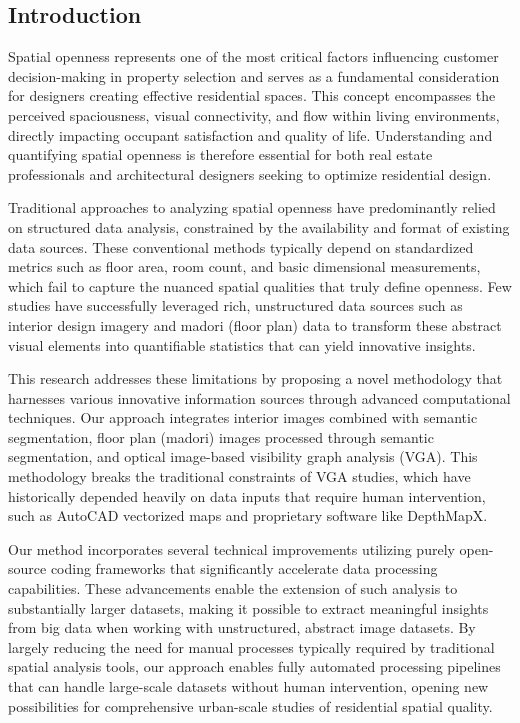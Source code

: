 \documentclass[11pt,a4paper]{article}
\begin{document}
\begin{multicols}{2}
\fontsize{11}{13}\selectfont

\section{Introduction}

Spatial openness represents one of the most critical factors influencing customer decision-making in
property selection and serves as a fundamental consideration for designers creating effective
residential spaces. This concept encompasses the perceived spaciousness, visual connectivity, and
flow within living environments, directly impacting occupant satisfaction and quality of life.
Understanding and quantifying spatial openness is therefore essential for both real estate
professionals and architectural designers seeking to optimize residential design.

Traditional approaches to analyzing spatial openness have predominantly relied on structured data
analysis, constrained by the availability and format of existing data sources. These conventional
methods typically depend on standardized metrics such as floor area, room count, and basic
dimensional measurements, which fail to capture the nuanced spatial qualities that truly define
openness. Few studies have successfully leveraged rich, unstructured data sources such as interior
design imagery and madori (floor plan) data to transform these abstract visual elements into
quantifiable statistics that can yield innovative insights.

This research addresses these limitations by proposing a novel methodology that harnesses various
innovative information sources through advanced computational techniques. Our approach integrates
interior images combined with semantic segmentation, floor plan (madori) images processed through
semantic segmentation, and optical image-based visibility graph analysis (VGA). This methodology
breaks the traditional constraints of VGA studies, which have historically depended heavily on data
inputs that require human intervention, such as AutoCAD vectorized maps and proprietary software
like DepthMapX.

Our method incorporates several technical improvements utilizing purely open-source coding
frameworks that significantly accelerate data processing capabilities. These advancements enable
the extension of such analysis to substantially larger datasets, making it possible to extract
meaningful insights from big data when working with unstructured, abstract image datasets. By
largely reducing the need for manual processes typically required by traditional spatial analysis
tools, our approach enables fully automated processing pipelines that can handle large-scale
datasets without human intervention, opening new possibilities for comprehensive urban-scale
studies of residential spatial quality.


\end{multicols}
\end{document}
